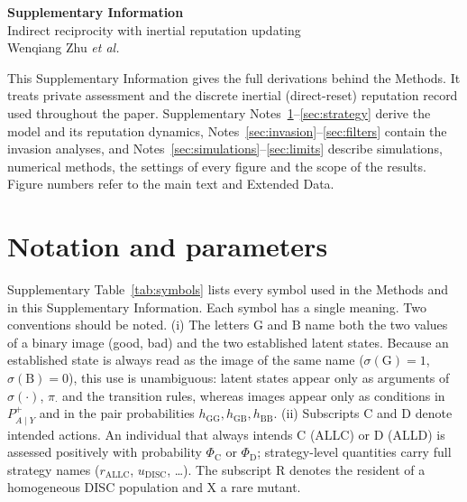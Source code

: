 \documentclass[fleqn,10pt]{article}
\theoremstyle{plain}
\theoremstyle{remark}
\newcommand{\G}{\mathrm G}
\newcommand{\B}{\mathrm B}
\newcommand{\C}{\mathrm C}
\newcommand{\D}{\mathrm D}
\newcommand{\ALLC}{\mathrm{ALLC}}
\newcommand{\DISC}{\mathrm{DISC}}
\begin{document}
\raggedbottom
\begin{center}
{\Large\sffamily\bfseries Supplementary Information}\\[0.6em]
{\large\sffamily Indirect reciprocity with inertial reputation updating}\\[0.4em]
{\small Wenqiang Zhu \textit{et al.}}
\end{center}

\vspace{0.5em}
\noindent This Supplementary Information gives the full derivations behind the
Methods. It treats private assessment and the discrete inertial
(direct-reset) reputation record used throughout the paper. Supplementary
Notes~\ref{sec:notation}--\ref{sec:strategy} derive the model and its
reputation dynamics, Notes~\ref{sec:invasion}--\ref{sec:filters} contain the
invasion analyses, and Notes~\ref{sec:simulations}--\ref{sec:limits} describe
simulations, numerical methods, the settings of every figure and the scope of
the results. Figure numbers refer to the main text and Extended Data.

{\small\tableofcontents}
\newpage

\section{Notation and parameters}
\label{sec:notation}

Supplementary Table~\ref{tab:symbols} lists every symbol used in the Methods
and in this Supplementary Information. Each symbol has a single meaning.
Two conventions should be noted.
(i) The letters $\G$ and $\B$ name both the two values of a binary image
(good, bad) and the two established latent states. Because an established state
is always read as the image of the same name
($\sigma(\G)=1$, $\sigma(\B)=0$), this use is unambiguous: latent states appear
only as arguments of $\sigma(\cdot)$, $\pi_\cdot$ and the transition rules,
whereas images appear only as conditions in $P^+_{A\mid Y}$ and in the
pair probabilities $h_{\G\G},h_{\G\B},h_{\B\B}$.
(ii) Subscripts $\C$ and $\D$ denote intended actions. An individual that always
intends $\C$ (ALLC) or $\D$ (ALLD) is assessed positively with probability
$\Phi_\C$ or $\Phi_\D$; strategy-level quantities carry full strategy names
($r_{\ALLC}$, $u_{\DISC}$, \dots). The subscript $\mathrm R$ denotes the
resident of a homogeneous DISC population and $\mathrm X$ a rare mutant.
\end{document}
